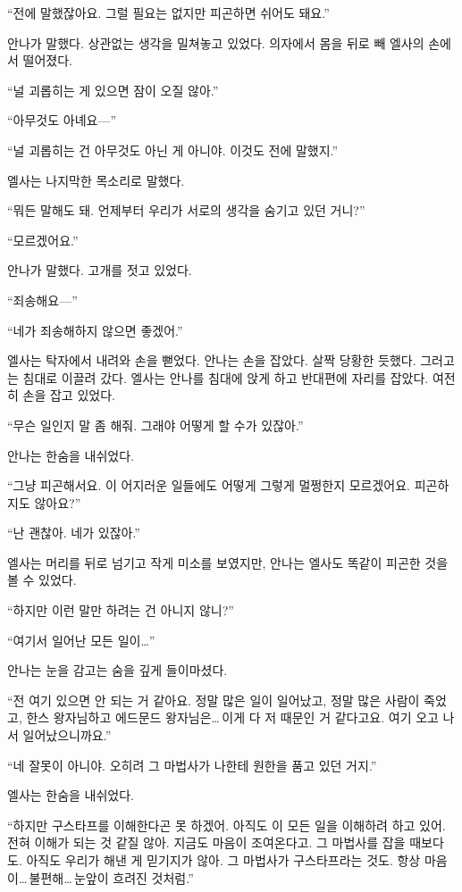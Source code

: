 ``전에 말했잖아요. 그럴 필요는 없지만 피곤하면 쉬어도 돼요.''

안나가 말했다. 상관없는 생각을 밀쳐놓고 있었다. 의자에서 몸을 뒤로 빼 엘사의 손에서 떨어졌다.

``널 괴롭히는 게 있으면 잠이 오질 않아.''

``아무것도 아녜요—''

``널 괴롭히는 건 아무것도 아닌 게 아니야. 이것도 전에 말했지.''

엘사는 나지막한 목소리로 말했다.

``뭐든 말해도 돼. 언제부터 우리가 서로의 생각을 숨기고 있던 거니?''

``모르겠어요.''

안나가 말했다. 고개를 젓고 있었다.

``죄송해요—''

``네가 죄송해하지 않으면 좋겠어.''

엘사는 탁자에서 내려와 손을 뻗었다. 안나는 손을 잡았다. 살짝 당황한 듯했다. 그러고는 침대로 이끌려 갔다. 엘사는 안나를 침대에 앉게 하고 반대편에 자리를 잡았다. 여전히 손을 잡고 있었다.

``무슨 일인지 말 좀 해줘. 그래야 어떻게 할 수가 있잖아.''

안나는 한숨을 내쉬었다.

``그냥 피곤해서요. 이 어지러운 일들에도 어떻게 그렇게 멀쩡한지 모르겠어요. 피곤하지도 않아요?''

``난 괜찮아. 네가 있잖아.''

엘사는 머리를 뒤로 넘기고 작게 미소를 보였지만, 안나는 엘사도 똑같이 피곤한 것을 볼 수 있었다.

``하지만 이런 말만 하려는 건 아니지 않니?''

``여기서 일어난 모든 일이\ldots''

안나는 눈을 감고는 숨을 깊게 들이마셨다.

``전 여기 있으면 안 되는 거 같아요. 정말 많은 일이 일어났고, 정말 많은 사람이 죽었고, 한스 왕자님하고 에드문드 왕자님은\ldots\,이게 다 저 때문인 거 같다고요. 여기 오고 나서 일어났으니까요.''

``네 잘못이 아니야. 오히려 그 마법사가 나한테 원한을 품고 있던 거지.''

엘사는 한숨을 내쉬었다.

``하지만 구스타프를 이해한다곤 못 하겠어. 아직도 이 모든 일을 이해하려 하고 있어. 전혀 이해가 되는 것 같질 않아. 지금도 마음이 조여온다고. 그 마법사를 잡을 때보다도. 아직도 우리가 해낸 게 믿기지가 않아. 그 마법사가 구스타프라는 것도. 항상 마음이\ldots\,불편해\ldots\,눈앞이 흐려진 것처럼.''

